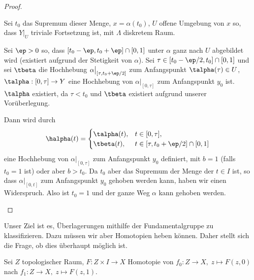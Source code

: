 \begin{proof}
\begin{bemn}[Existenz.]
Sei $t_0$ das Supremum dieser Menge, $x=\alpha(t_0)$, $U$ offene Umgebung von
$x$ so, dass $Y\big|_U$ triviale Fortsetzung ist, mit $\Lambda$ diskretem Raum.

Sei $\ep > 0$ so, dass $[t_0-\ep,t_0+\ep]\cap[0,1]$ unter $\alpha$ ganz nach
$U$ abgebildet wird (existiert aufgrund der Stetigkeit von $\alpha$). Sei
$\tau\in[t_0-\ep/2,t_0]\cap[0,1]$ und sei $\tbeta$ die Hochhebung
$\alpha\big|_{[\tau,t_0+\ep/2]}$ zum Anfangspunkt $\talpha(\tau)\in U$,
$\talpha: [0,\tau]\to Y$ eine Hochhebung von $\alpha\big|_{[0,\tau]}$ zum
Anfangspunkt $y_0$ ist. $\talpha$ existiert, da $\tau<t_0$ und $\tbeta$
existiert aufgrund unserer Vorüberlegung.

Dann wird durch
\begin{align*}
\halpha(t) = \begin{cases}
\talpha(t), & t\in[0,\tau],\\
\tbeta(t), & t\in [\tau,t_0+\ep/2]\cap[0,1]
             \end{cases}
\end{align*}
eine Hochhebung von $\alpha\big|_{[0,\tau]}$ zum Anfangspunkt $y_0$ definiert,
mit $b=1$ (falls $t_0=1$ ist) oder aber $b>t_0$. Da $t_0$ aber das Supremum der
Menge der $t\in I$ ist, so dass $\alpha\big|_{[0,t]}$ zum Anfangspunkt $y_0$
gehoben werden kann, haben wir einen Widerspruch. Also ist $t_0=1$ und der
ganze Weg $\alpha$ kann gehoben werden.\qedhere
\end{bemn}
\end{proof}

Unser Ziel ist es, Überlagerungen mithilfe der Fundamentalgruppe zu
klassifizieren. Dazu müssen wir aber Homotopien heben können. Daher stellt sich
die Frage, ob dies überhaupt möglich ist.


Sei $Z$ topologischer Raum, $F: Z\times I \to X$ Homotopie von $f_0: Z\to X,\;
z\mapsto F(z,0)$ nach $f_1: Z\to X,\; z\mapsto F(z,1)$.

